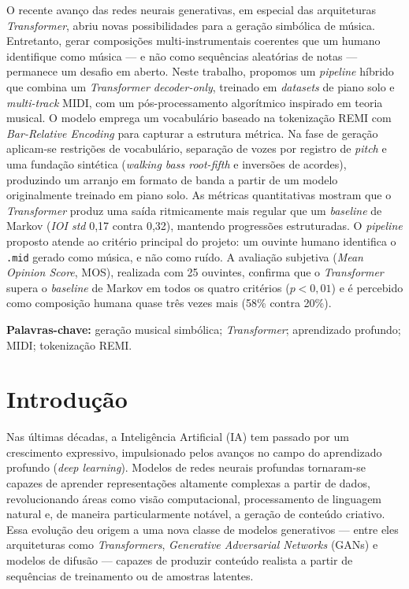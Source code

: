 \documentclass[12pt]{article}
\begin{document}
\begin{resumo}
O recente avanço das redes neurais generativas, em especial das arquiteturas
\emph{Transformer}, abriu novas possibilidades para a geração simbólica de
música. Entretanto, gerar composições multi-instrumentais coerentes que um
humano identifique como música --- e não como sequências aleatórias de notas ---
permanece um desafio em aberto. Neste trabalho, propomos um \emph{pipeline}
híbrido que combina um \emph{Transformer decoder-only}, treinado em
\emph{datasets} de piano solo e \emph{multi-track} MIDI, com um pós-processamento
algorítmico inspirado em teoria musical. O modelo emprega um vocabulário baseado
na tokenização REMI com \emph{Bar-Relative Encoding} para capturar a estrutura
métrica. Na fase de geração aplicam-se restrições de vocabulário, separação de
vozes por registro de \emph{pitch} e uma fundação sintética (\emph{walking bass
root-fifth} e inversões de acordes), produzindo um arranjo em formato de banda a
partir de um modelo originalmente treinado em piano solo. As métricas
quantitativas mostram que o \emph{Transformer} produz uma saída ritmicamente mais
regular que um \emph{baseline} de Markov (\emph{IOI std} 0,17 contra 0,32),
mantendo progressões estruturadas. O \emph{pipeline} proposto atende ao critério
principal do projeto: um ouvinte humano identifica o \texttt{.mid} gerado como
música, e não como ruído. A avaliação subjetiva (\emph{Mean Opinion Score}, MOS),
realizada com 25 ouvintes, confirma que o \emph{Transformer} supera o
\emph{baseline} de Markov em todos os quatro critérios ($p < 0{,}01$) e é
percebido como composição humana quase três vezes mais (58\% contra 20\%).

\textbf{Palavras-chave:} geração musical simbólica; \emph{Transformer};
aprendizado profundo; MIDI; tokenização REMI.
\end{resumo}

\section{Introdução}

Nas últimas décadas, a Inteligência Artificial (IA) tem passado por um
crescimento expressivo, impulsionado pelos avanços no campo do aprendizado
profundo (\emph{deep learning}). Modelos de redes neurais profundas tornaram-se
capazes de aprender representações altamente complexas a partir de dados,
revolucionando áreas como visão computacional, processamento de linguagem
natural e, de maneira particularmente notável, a geração de conteúdo criativo.
Essa evolução deu origem a uma nova classe de modelos generativos --- entre eles
arquiteturas como \emph{Transformers}, \emph{Generative Adversarial Networks}
(GANs) e modelos de difusão --- capazes de produzir conteúdo realista a partir de
sequências de treinamento ou de amostras latentes.
\end{document}
